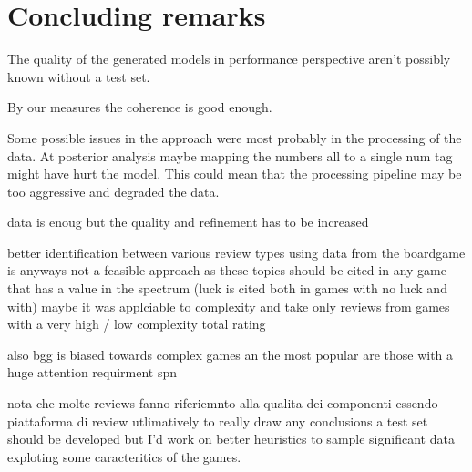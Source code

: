\section{Concluding remarks}

The quality of the generated models in performance perspective aren't possibly known without a test set.

By our measures the coherence is good enough.


Some possible issues in the approach were most probably in the processing of the data.
At posterior analysis maybe mapping the numbers all to a single num tag might have hurt the model.
This could mean that the processing pipeline may be too aggressive and degraded the data.


data is enoug but the quality and refinement has to be increased

better identification between various review types
using data from the boardgame is anyways not a feasible approach as these topics should
be cited in any game that has a value in the spectrum (luck is cited both in games with no luck and with)
maybe it was applciable to complexity and take only reviews from games with a very high / low complexity total rating

also bgg is biased towards complex games an the most popular are those with a huge
attention requirment spn

nota che molte reviews fanno riferiemnto alla qualita dei componenti essendo piattaforma di review
utlimatively to really draw any conclusions a test set should be developed but I'd work on
better heuristics to sample significant data exploting some caracteritics of the games.
